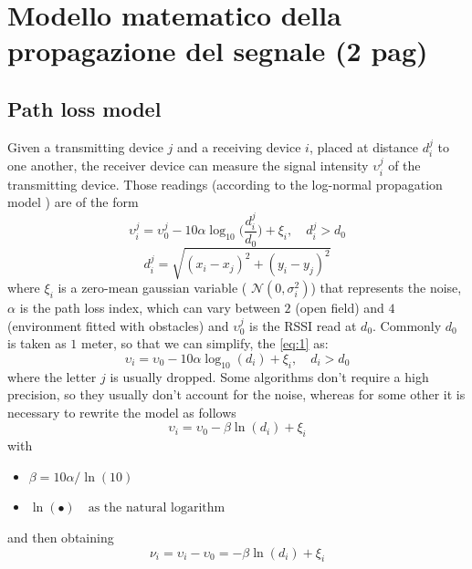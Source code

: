 \documentclass[12pt,twoside]{report}
\begin{document}
\clearpage

\chapter{Modello matematico della propagazione del segnale (2 pag)}
\section{Path loss model}
Given a transmitting device $j$ and a receiving device $i$, placed at distance $d_i^j$ to one another, the receiver device can measure the signal intensity $\upsilon_i^j$ of the transmitting device. Those readings (according to the log-normal propagation model  \cite{MUNOZ200923}) are of the form
\begin{equation}
\upsilon_i^j = \upsilon_0^j-10\alpha\log_{10}\bigg(\frac{d_i^j}{d_0}\bigg) + \xi_i, \quad d_i^j>d_0
\label{eq:1}
\end{equation}
\begin{equation}
    d_i^j=\sqrt{(x_i-x_j)^2+(y_i-y_j)^2}
\end{equation}
where $\xi_i$ is a zero-mean gaussian variable ( $\mathcal{N}(0,\sigma^2_i)$) that represents the noise, $\alpha$ is the path loss index, which can vary between $2$ (open field) and $4$ (environment fitted with obstacles) and $\upsilon_0^j$ is the RSSI read at $d_0$. Commonly $d_0$ is taken as $1$ meter, so that we can simplify, the \ref{eq:1} as:
\begin{equation}
\upsilon_i = \upsilon_0-10\alpha\log_{10}(d_i) + \xi_i, \quad d_i>d_0
\label{eq:2}
\end{equation}
where the letter $j$ is usually dropped.
Some algorithms don't require a high precision, so they usually don't account for the noise, whereas for some other it is necessary to rewrite the model as follows
\begin{equation}
\upsilon_i= \upsilon_0-\beta\ln(d_i) + \xi_i
\end{equation}
with
\begin{itemize}
    \item $\beta=10\alpha/\ln(10)$
    \item $\ln(\bullet)\quad \text{as the natural logarithm}$
\end{itemize}
and then obtaining
\begin{equation}
\nu_i = \upsilon_i-\upsilon_0= -\beta\ln(d_i) + \xi_i
\label{eq:5}
\end{equation}
\clearpage
\end{document}
